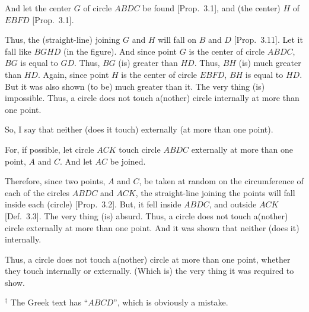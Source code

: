 \begin{Parallel}{}{}
{And let the center $G$ of circle $ABDC$ be found [Prop.~3.1], and
(the center) $H$ of $EBFD$ [Prop.~3.1].

Thus, the (straight-line) joining $G$ and $H$ will fall on $B$ and $D$ [Prop.~3.11].
Let it fall like $BGHD$ (in the figure). And since point $G$ is the center of
circle $ABDC$, $BG$ is  equal to $GD$. Thus, $BG$ (is) greater than $HD$.
Thus, $BH$ (is) much greater than $HD$. Again, since point $H$ is the
center of circle $EBFD$, $BH$ is equal to $HD$. But it was also shown
(to be) much greater than it. The very thing (is) impossible.
Thus, a circle does not touch a(nother) circle internally at more than one point.

So, I say that neither (does it touch) externally (at more than one point).

For, if possible, let circle $ACK$ touch circle $ABDC$ externally at more
than one point, $A$ and $C$. And let $AC$ be joined.

Therefore, since  two points, $A$ and $C$,
be taken at random on the circumference
of each of the circles $ABDC$ and $ACK$, the straight-line joining
the points will fall inside each (circle) [Prop.~3.2]. But, it fell
inside $ABDC$, and outside $ACK$ [Def.~3.3]. The very thing (is) absurd.
Thus, a circle does not touch a(nother) circle externally  at more than one
point. And it was shown that neither (does it) internally.

Thus, a circle does not touch a(nother) circle at more than one point, whether they touch internally or externally. (Which is) the very thing it was required to
show.}
\end{Parallel}
{\footnotesize \noindent$^\dag$ The Greek text has ``$ABCD$'', which is obviously a mistake.}

